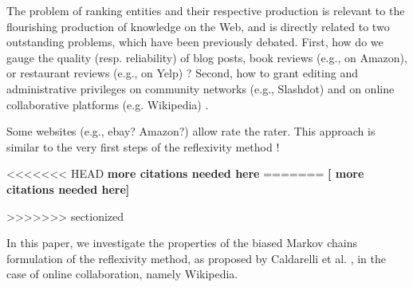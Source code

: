 %
%
%

The problem of ranking entities and their respective production is relevant to the 
flourishing production of knowledge on the Web, and is directly related to two outstanding problems, which have been previously debated. First, how do we gauge the quality (resp. reliability) of blog posts, book reviews (e.g., on Amazon), or restaurant reviews (e.g., on Yelp) ?  Second,  how to grant editing and administrative privileges on community networks (e.g., Slashdot) and on online collaborative platforms (e.g. Wikipedia) \cite{halfaker2013}. 

Some websites (e.g., ebay? Amazon?) allow rate the rater. This approach is similar to the very first steps of the reflexivity method ! \cite{citation needed.}

<<<<<<< HEAD
{\bf more citations needed here}
=======
{\bf [ more citations needed here]}


>>>>>>> sectionized

In this paper, we investigate the properties of the biased Markov chains formulation of the reflexivity method, as proposed by Caldarelli et al. \cite{caldarelli2012network}, in the case of online collaboration, namely Wikipedia.

